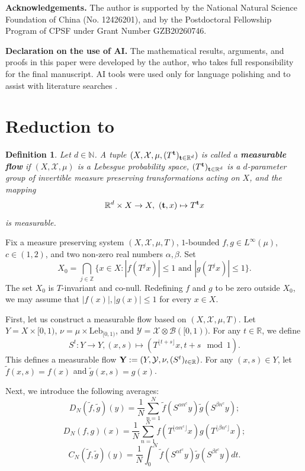 \documentclass[reqno,12pt]{amsart}
\newtheorem{defn}[thm]{Definition}
\def \N {\mathbb N}
\def \Z {\mathbb Z}
\def \R {\mathbb R}
\def \X {\mathcal{X}}
\def \Y {\mathcal{Y}}
\numberwithin{equation}{section}
\begin{document}
\medskip
\noindent\textbf{Acknowledgements.}
The author is supported by the National Natural Science Foundation of China (No. 12426201), and by the Postdoctoral Fellowship Program of CPSF under Grant Number GZB20260746.

\medskip
\noindent\textbf{Declaration on the use of AI.}
The mathematical results, arguments, and proofs in this paper 
were developed by the author, who takes full responsibility for the final manuscript.
AI tools were used only for language polishing and to assist with literature searches . 
\section{Reduction to \texorpdfstring{}{Theorem~}}
\begin{defn}
	Let $d\in \N$. A tuple $(X,\X,\mu, (T^{{\bf t}})_{{\bf t}\in \R^{d}})$ is called a {\bf measurable flow} if $(X,\X,\mu )$ is a Lebesgue probability space, $(T^{\bf t})_{{\bf t}\in \R^{d}}$ is a $d$-parameter group of invertible measure preserving transformations acting on $X$, and the mapping $$\R^d\times X\rightarrow X, \ ({\bf t}, x)\mapsto T^{{\bf t}}x$$ is measurable.
\end{defn}
Fix a measure preserving system $(X,\X,\mu,T)$, $1$-bounded $f,g\in L^{\infty}(\mu)$, $c\in (1,2)$, and two non-zero real numbers $\alpha,\beta$. Set
\[
 X_0=\bigcap_{j\in\Z}
 \{x\in X:|f(T^jx)|\le1\text{ and }|g(T^jx)|\le1\}.
\]
The set $X_0$ is $T$-invariant and co-null. Redefining $f$ and $g$ to be
zero outside $X_0$, we may assume that $|f(x)|,|g(x)|\le1$ for every $x\in X$.

First, let us construct a measurable flow based on $(X,\X,\mu,T)$.  Let $Y=X\times [0,1)$, $\nu=\mu\times \text{Leb}_{[0,1)}$, and $\Y=\X\otimes \mathcal{B}([0,1))$. For any $t\in \R$, we define $$S^{t}:Y\to Y,(x,s)\mapsto (T^{\lfloor t+s\rfloor}x,t+s\mod{1}).$$ This defines a measurable flow ${\bf Y}:=(Y,\Y,\nu,(S^t)_{t\in \R})$. For any $(x,s)\in Y$, let $\tilde{f}(x,s)=f(x)$ and $\tilde{g}(x,s)=g(x)$. 

Next, we introduce the following averages:
$$D_{N}(\tilde{f},\tilde{g})(y)=\frac{1}{N}\sum_{n=1}^{N}\tilde{f}(S^{\alpha n^c}y)\tilde{g}(S^{\beta n^c}y);$$
$$D_{N}(f,g)(x)=\frac{1}{N}\sum_{n=1}^{N}f(T^{\lfloor \alpha n^c \rfloor}x)g(T^{\lfloor \beta n^c \rfloor}x);$$
$$C_N(\tilde{f},\tilde{g})(y)=\frac{1}{N}\int_{0}^{N}\tilde{f}(S^{\alpha t^c}y)\tilde{g}(S^{\beta t^c}y)dt.$$
\end{document}

